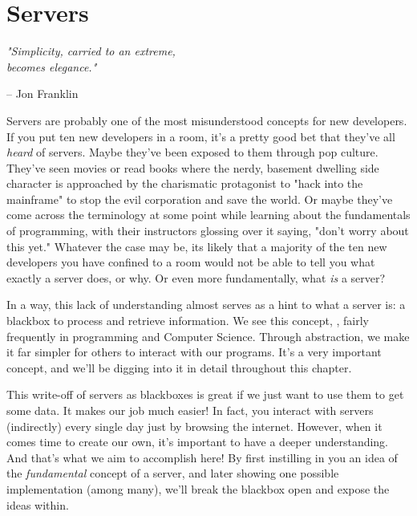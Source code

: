 \setchapterpreamble[u]{\margintoc}
\chapter{Servers}
\epigraph{\emph{"Simplicity, carried to an extreme, \\ becomes elegance."}}{ -- Jon Franklin}

Servers are probably one of the most misunderstood concepts for new developers. If you put ten new developers in a room, it's a pretty good bet that they've all \emph{heard} of servers. Maybe they've been exposed to them through pop culture. They've seen movies or read books where the nerdy, basement dwelling side character is approached by the charismatic protagonist to "hack into the mainframe" to stop the evil corporation and save the world. Or maybe they've come across the terminology at some point while learning about the fundamentals of programming, with their instructors glossing over it saying, "don't worry about this yet." Whatever the case may be, its likely that a majority of the ten new developers you have confined to a room would not be able to tell you what exactly a server does, or why. Or even more fundamentally, what \emph{is} a server? 

In a way, this lack of understanding almost serves as a hint to what a server is: a blackbox to process and retrieve information. We see this concept, , fairly frequently in programming and Computer Science. Through abstraction, we make it far simpler for others to interact with our programs. It's a very important concept, and we'll be digging into it in detail throughout this chapter. 

This write-off of servers as blackboxes is great if we just want to use them to get some data. It makes our job much easier! In fact, you interact with servers (indirectly) every single day just by browsing the internet. However, when it comes time to create our own, it's important to have a deeper understanding. And that's what we aim to accomplish here! By first instilling in you an idea of the \emph{fundamental} concept of a server, and later showing one possible implementation (among many), we'll break the blackbox open and expose the ideas within.

